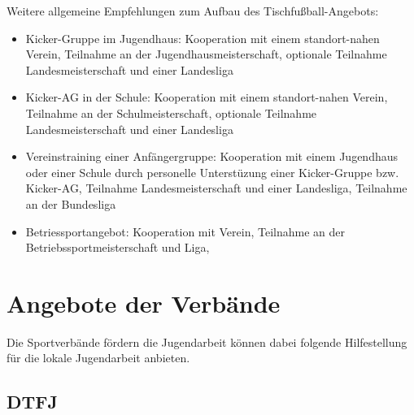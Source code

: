 Weitere allgemeine Empfehlungen zum Aufbau des Tischfußball-Angebots:
\begin{itemize}
\item Kicker-Gruppe im Jugendhaus: 
Kooperation mit einem standort-nahen Verein,
Teilnahme an der Jugendhausmeisterschaft,  
optionale Teilnahme Landesmeisterschaft und einer Landesliga
\item Kicker-AG in der Schule: 
Kooperation mit einem standort-nahen Verein, 
Teilnahme an der Schulmeisterschaft, 
optionale Teilnahme Landesmeisterschaft und einer Landesliga
\item Vereinstraining einer Anfängergruppe: 
Kooperation mit einem Jugendhaus oder einer Schule durch personelle Unterstüzung einer Kicker-Gruppe bzw. Kicker-AG, 
Teilnahme Landesmeisterschaft und einer Landesliga,
Teilnahme an der Bundesliga
\item Betriessportangebot: 
Kooperation mit Verein, 
Teilnahme an der Betriebssportmeisterschaft und Liga,
\end{itemize}



\section{Angebote der Verbände}
\label{jugend:kontakte}

Die Sportverbände fördern die Jugendarbeit können dabei folgende Hilfestellung für die lokale Jugendarbeit anbieten.

\subsection{DTFJ}
\label{jugend:kontakte:dtfj}

